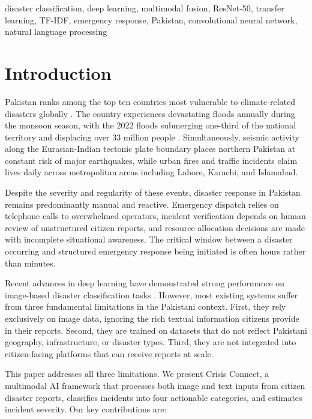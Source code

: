 \documentclass[conference]{IEEEtran}
\begin{document}
\begin{IEEEkeywords}
disaster classification, deep learning, multimodal fusion, ResNet-50, transfer learning, TF-IDF, emergency response, Pakistan, convolutional neural network, natural language processing
\end{IEEEkeywords}

\section{Introduction}
\label{sec:intro}

Pakistan ranks among the top ten countries most vulnerable to climate-related disasters globally \cite{germanwatch2021}. The country experiences devastating floods annually during the monsoon season, with the 2022 floods submerging one-third of the national territory and displacing over 33 million people \cite{ndma2022}. Simultaneously, seismic activity along the Eurasian-Indian tectonic plate boundary places northern Pakistan at constant risk of major earthquakes, while urban fires and traffic incidents claim lives daily across metropolitan areas including Lahore, Karachi, and Islamabad.

Despite the severity and regularity of these events, disaster response in Pakistan remains predominantly manual and reactive. Emergency dispatch relies on telephone calls to overwhelmed operators, incident verification depends on human review of unstructured citizen reports, and resource allocation decisions are made with incomplete situational awareness. The critical window between a disaster occurring and structured emergency response being initiated is often hours rather than minutes.

Recent advances in deep learning have demonstrated strong performance on image-based disaster classification tasks \cite{alam2018processing, nguyen2017damage}. However, most existing systems suffer from three fundamental limitations in the Pakistani context. First, they rely exclusively on image data, ignoring the rich textual information citizens provide in their reports. Second, they are trained on datasets that do not reflect Pakistani geography, infrastructure, or disaster types. Third, they are not integrated into citizen-facing platforms that can receive reports at scale.

This paper addresses all three limitations. We present Crisis Connect, a multimodal AI framework that processes both image and text inputs from citizen disaster reports, classifies incidents into four actionable categories, and estimates incident severity. Our key contributions are:
\end{document}
